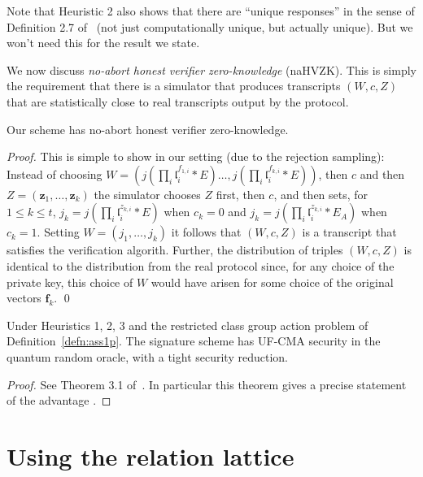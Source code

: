 \documentclass{llncs}
\renewcommand{\l}{\mathfrak{l}}
\newcommand{\f}{\textbf{f}}
\newcommand{\z}{\textbf{z}}
\begin{document}
Note that Heuristic 2 also shows that there are ``unique responses'' in the sense of Definition 2.7 of~\cite{KLS18} (not just computationally unique, but actually unique). But we won't need this for the result we state.


We now discuss \emph{no-abort honest verifier zero-knowledge} (naHVZK).
This is simply the requirement that there is a simulator that produces transcripts $(W,c,Z)$ that are statistically close to real transcripts output by the protocol.


\begin{lemma}
Our scheme has no-abort honest verifier zero-knowledge.
\end{lemma}

\begin{proof}
This is simple to show in our setting (due to the rejection sampling): Instead of choosing $W = ( j(\prod_i \l_i^{f_{1,i}} * E) \dots, j( \prod_i \l_i^{f_{k,i}} * E ))$, then $c$ and then $Z = (\z_1, \dots, \z_k)$ the simulator chooses $Z$ first, then $c$, and then sets, for $1 \le k \le t$, $j_k = j( \prod_i \l_i^{z_{k,i}} * E )$ when $c_k=0$ and $j_k = j( \prod_i \l_i^{z_{k,i}} * E_A )$ when $c_k = 1$.
Setting $W = (j_1,\dots, j_k)$ it follows that $(W, c, Z )$ is a transcript that satisfies the verification algorith.
Further, the distribution of triples $(W,c,Z)$ is identical to the distribution from the real protocol since, for any choice of the private key, this choice of $W$ would have arisen for some choice of the original vectors $\f_k$. \qed
\end{proof}




\begin{theorem}
Under Heuristics 1, 2, 3 and the restricted class group action problem of Definition~\ref{defn:ass1p}.
The signature scheme has UF-CMA security in the quantum random oracle, with a tight security reduction.
\end{theorem}
 

\begin{proof}
See Theorem 3.1 of~\cite{KLS18}.
In particular this theorem gives a precise statement of the advantage .
\end{proof}





\section{Using the relation lattice}\label{sec:sig-relation-lattice}
\end{document}

